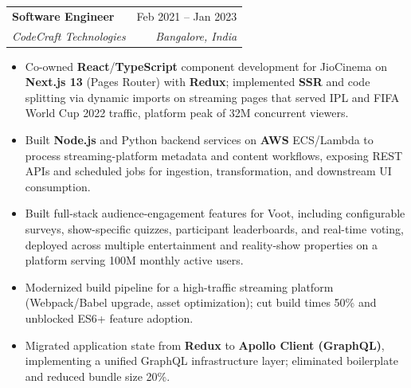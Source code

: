 \documentclass[letterpaper,10.5pt]{article}
\makeatletter
\newcommand{\resumeItem}[1]{
  \item\small{{#1 \vspace{-2pt}}}
}
\newcommand{\resumeSubheading}[4]{
  \vspace{1pt}\item
    \begin{tabular*}{0.97\textwidth}[t]{l@{\extracolsep{\fill}}r}
      \textbf{#1} & #2 \\
      \textit{\small#3} & \textit{\small #4} \\
    \end{tabular*}\vspace{-7pt}
}
\newcommand{\resumeItemListStart}{\begin{itemize}}
\newcommand{\resumeItemListEnd}{\end{itemize}\vspace{-5pt}}
\makeatother
\begin{document}

    \resumeSubheading
      {Software Engineer}{Feb 2021 -- Jan 2023}
      {CodeCraft Technologies}{Bangalore, India}
      \resumeItemListStart
        \resumeItem{Co-owned \textbf{React}/\textbf{TypeScript} component development for JioCinema on \textbf{Next.js 13} (Pages Router) with \textbf{Redux}; implemented \textbf{SSR} and code splitting via dynamic imports on streaming pages that served IPL and FIFA World Cup 2022 traffic, platform peak of 32M concurrent viewers.}
        \resumeItem{Built \textbf{Node.js} and Python backend services on \textbf{AWS} ECS/Lambda to process streaming-platform metadata and content workflows, exposing REST APIs and scheduled jobs for ingestion, transformation, and downstream UI consumption.}
        \resumeItem{Built full-stack audience-engagement features for Voot, including configurable surveys, show-specific quizzes, participant leaderboards, and real-time voting, deployed across multiple entertainment and reality-show properties on a platform serving 100M monthly active users.}
        \resumeItem{Modernized build pipeline for a high-traffic streaming platform (Webpack/Babel upgrade, asset optimization); cut build times 50\% and unblocked ES6+ feature adoption.}
        \resumeItem{Migrated application state from \textbf{Redux} to \textbf{Apollo Client (GraphQL)}, implementing a unified GraphQL infrastructure layer; eliminated boilerplate and reduced bundle size 20\%.}
    \resumeItemListEnd
        
\end{document}
